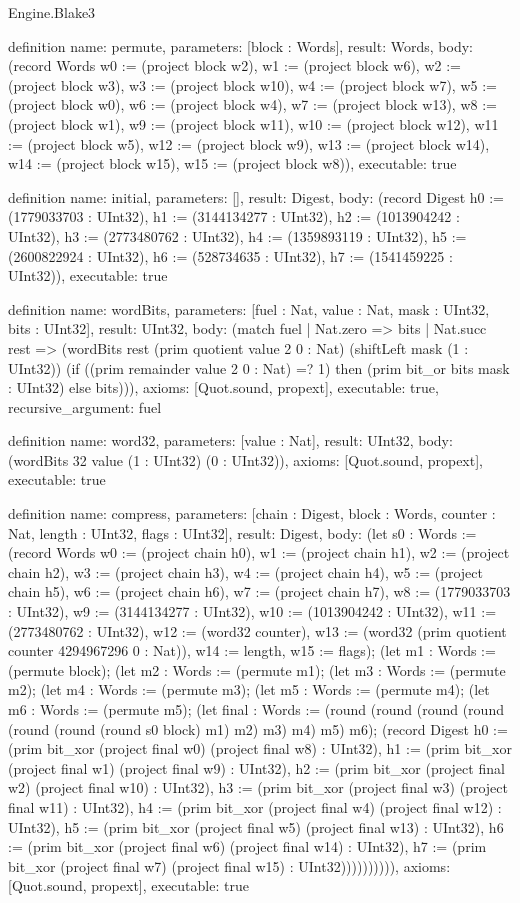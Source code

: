 \begin{lexlean}{Engine.Blake3}
\begin{semanticmodule}
definition{
  name: permute,
  parameters: [block : Words],
  result: Words,
  body: (record Words {w0 := (project block w2), w1 := (project block w6), w2 := (project block w3), w3 := (project block w10), w4 := (project block w7), w5 := (project block w0), w6 := (project block w4), w7 := (project block w13), w8 := (project block w1), w9 := (project block w11), w10 := (project block w12), w11 := (project block w5), w12 := (project block w9), w13 := (project block w14), w14 := (project block w15), w15 := (project block w8)}),
  executable: true
}

definition{
  name: initial,
  parameters: [],
  result: Digest,
  body: (record Digest {h0 := (1779033703 : UInt32), h1 := (3144134277 : UInt32), h2 := (1013904242 : UInt32), h3 := (2773480762 : UInt32), h4 := (1359893119 : UInt32), h5 := (2600822924 : UInt32), h6 := (528734635 : UInt32), h7 := (1541459225 : UInt32)}),
  executable: true
}

definition{
  name: wordBits,
  parameters: [fuel : Nat, value : Nat, mask : UInt32, bits : UInt32],
  result: UInt32,
  body: (match fuel
    | Nat.zero => bits
    | Nat.succ rest => (wordBits rest (prim quotient value 2 0 : Nat) (shiftLeft mask (1 : UInt32)) (if ((prim remainder value 2 0 : Nat) =? 1) then (prim bit_or bits mask : UInt32) else bits))),
  axioms: [Quot.sound, propext],
  executable: true,
  recursive_argument: fuel
}

definition{
  name: word32,
  parameters: [value : Nat],
  result: UInt32,
  body: (wordBits 32 value (1 : UInt32) (0 : UInt32)),
  axioms: [Quot.sound, propext],
  executable: true
}

definition{
  name: compress,
  parameters: [chain : Digest, block : Words, counter : Nat, length : UInt32, flags : UInt32],
  result: Digest,
  body: (let s0 : Words := (record Words {w0 := (project chain h0), w1 := (project chain h1), w2 := (project chain h2), w3 := (project chain h3), w4 := (project chain h4), w5 := (project chain h5), w6 := (project chain h6), w7 := (project chain h7), w8 := (1779033703 : UInt32), w9 := (3144134277 : UInt32), w10 := (1013904242 : UInt32), w11 := (2773480762 : UInt32), w12 := (word32 counter), w13 := (word32 (prim quotient counter 4294967296 0 : Nat)), w14 := length, w15 := flags}); (let m1 : Words := (permute block); (let m2 : Words := (permute m1); (let m3 : Words := (permute m2); (let m4 : Words := (permute m3); (let m5 : Words := (permute m4); (let m6 : Words := (permute m5); (let final : Words := (round (round (round (round (round (round (round s0 block) m1) m2) m3) m4) m5) m6); (record Digest {h0 := (prim bit_xor (project final w0) (project final w8) : UInt32), h1 := (prim bit_xor (project final w1) (project final w9) : UInt32), h2 := (prim bit_xor (project final w2) (project final w10) : UInt32), h3 := (prim bit_xor (project final w3) (project final w11) : UInt32), h4 := (prim bit_xor (project final w4) (project final w12) : UInt32), h5 := (prim bit_xor (project final w5) (project final w13) : UInt32), h6 := (prim bit_xor (project final w6) (project final w14) : UInt32), h7 := (prim bit_xor (project final w7) (project final w15) : UInt32)}))))))))),
  axioms: [Quot.sound, propext],
  executable: true
}


\end{semanticmodule}
\end{lexlean}
